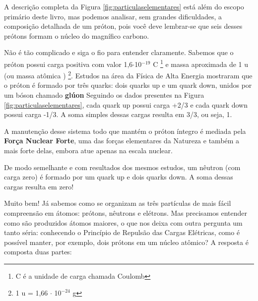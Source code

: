 \documentclass[a4paper,12pt,]{book}
\begin{document}
A descrição completa da Figura \ref{fig:particulaselementares} está além do escopo primário deste livro, mas podemos analisar, sem grandes dificuldades, a composição detalhada de um próton, pois você deve lembrar-se que seis desses prótons formam o núcleo do magnífico carbono.

Não é tão complicado e siga o fio para entender claramente. Sabemos que o próton possui carga positiva com valor 1,6{$\cdot$}10{$^{-19}$} C \footnote{C é a unidade de carga chamada Coulomb} e massa aproximada de 1 u (ou massa atômica \cite{IUPAC+A00496+2019}) \footnote{1 u = 1,66 $\cdot$ 10$^{-24}$ g}. Estudos na área da Física de Alta Energia mostraram que o próton é formado por três quarks: dois quarks up e um quark down, unidos por um bóson chamado \textbf{glúon} Seguindo os dados presentes na Figura \ref{fig:particulaselementares}, cada quark up possui carga +2/3 e cada quark down possui carga -1/3. A soma simples dessas cargas resulta em 3/3, ou seja, 1. 

A manutenção desse sistema todo que mantém o próton íntegro é mediada pela \textbf{Força Nuclear Forte}, uma das forças elementares da Natureza e também a mais forte delas, embora atue apenas na escala nuclear.

De modo semelhante e com resultados dos mesmos estudos, um nêutron (com carga zero) é formado por um quark up e dois quarks down. A soma dessas cargas resulta em zero!

Muito bem! Já sabemos como se organizam as três partículas de mais fácil compreensão em átomos: prótons, nêutrons e elétrons. Mas precisamos entender como são produzidos átomos maiores, o que nos deixa com outra pergunta um tanto séria: conhecendo o Princípio de Repulsão das Cargas Elétricas, como é possível manter, por exemplo, dois prótons em um núcleo atômico? A resposta é composta duas partes:
\end{document}

